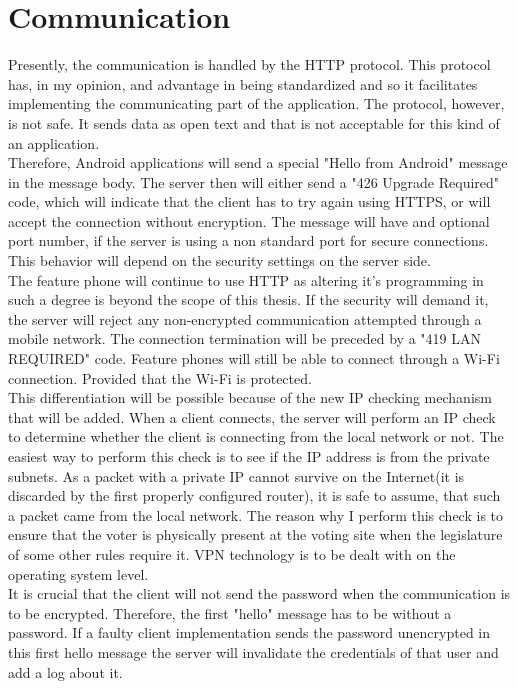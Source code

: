 \documentclass[11pt,twoside,a4paper]{book}
\begin{document}
\section{Communication}

Presently, the communication is handled by the HTTP protocol. This protocol has, in my opinion, and advantage in being standardized and so it facilitates implementing the communicating part of the application. The protocol, however, is not safe. It sends data as open text and that is not acceptable for this kind of an application.\\
 Therefore, Android applications will send a special "Hello from Android" message in the message body. The server then will either send a "426 Upgrade Required" code, which will indicate that the client has to try again using HTTPS, or will accept the connection without encryption. The message will have and optional port number, if the server is using a non standard port for secure connections. This behavior will depend on the security settings on the server side. \\
  The feature phone will continue to use HTTP as altering it's programming in such a degree is beyond the scope of this thesis. If the security will demand it, the server will reject any non-encrypted communication attempted through a mobile network. The connection termination will be preceded by a "419 LAN REQUIRED" code. Feature phones will still be able to connect through a Wi-Fi connection. Provided that the Wi-Fi is protected.\\
 
This differentiation will be possible because of the new IP checking mechanism that will be added. When a client connects, the server will perform an IP check to determine whether the client is connecting from the local network or not. The easiest way to perform this check is to see if the IP address is from the private subnets. As a packet with a private IP cannot survive on the Internet(it is discarded by the first properly configured router), it is safe to assume, that such a packet came from the local network. The reason why I perform this check is to ensure that the voter is physically present at the voting site when the legislature of some other rules require it. VPN technology is to be dealt with on the operating system level.\\

It is crucial that the client will not send the password when the communication is to be encrypted. Therefore, the first "hello" message has to be without a password. If a faulty client implementation sends the password unencrypted in this first hello message the server will invalidate the credentials of that user and add a log about it.\\
\end{document}
